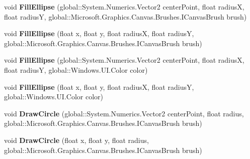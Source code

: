 \begin{DoxyCompactItemize}
\item 
\mbox{\label{class_microsoft_1_1_graphics_1_1_canvas_1_1_canvas_drawing_session_a2850ffcea774b66b3dfb2100996910f6}} 
void {\bfseries Fill\+Ellipse} (global\+::\+System.\+Numerics.\+Vector2 center\+Point, float radiusX, float radiusY, global\+::\+Microsoft.\+Graphics.\+Canvas.\+Brushes.\+I\+Canvas\+Brush brush)
\item 
\mbox{\label{class_microsoft_1_1_graphics_1_1_canvas_1_1_canvas_drawing_session_a25a4a1e0f22a867afbb82d71686cfca9}} 
void {\bfseries Fill\+Ellipse} (float x, float y, float radiusX, float radiusY, global\+::\+Microsoft.\+Graphics.\+Canvas.\+Brushes.\+I\+Canvas\+Brush brush)
\item 
\mbox{\label{class_microsoft_1_1_graphics_1_1_canvas_1_1_canvas_drawing_session_aca954c8d9a09f13f907f8886692f1074}} 
void {\bfseries Fill\+Ellipse} (global\+::\+System.\+Numerics.\+Vector2 center\+Point, float radiusX, float radiusY, global\+::\+Windows.\+U\+I.\+Color color)
\item 
\mbox{\label{class_microsoft_1_1_graphics_1_1_canvas_1_1_canvas_drawing_session_a798f467f35e7944331a03a89ce48d954}} 
void {\bfseries Fill\+Ellipse} (float x, float y, float radiusX, float radiusY, global\+::\+Windows.\+U\+I.\+Color color)
\item 
\mbox{\label{class_microsoft_1_1_graphics_1_1_canvas_1_1_canvas_drawing_session_a2175af501fac35ca7d03ddf40c04546e}} 
void {\bfseries Draw\+Circle} (global\+::\+System.\+Numerics.\+Vector2 center\+Point, float radius, global\+::\+Microsoft.\+Graphics.\+Canvas.\+Brushes.\+I\+Canvas\+Brush brush)
\item 
\mbox{\label{class_microsoft_1_1_graphics_1_1_canvas_1_1_canvas_drawing_session_aef85641b12aef9c2b746df1fa8af9340}} 
void {\bfseries Draw\+Circle} (float x, float y, float radius, global\+::\+Microsoft.\+Graphics.\+Canvas.\+Brushes.\+I\+Canvas\+Brush brush)

\end{DoxyCompactItemize}

